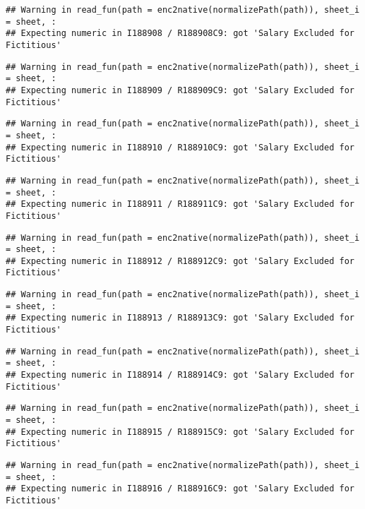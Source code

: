 \documentclass[
]{article}
\begin{document}
\begin{verbatim}
## Warning in read_fun(path = enc2native(normalizePath(path)), sheet_i = sheet, :
## Expecting numeric in I188908 / R188908C9: got 'Salary Excluded for Fictitious'
\end{verbatim}

\begin{verbatim}
## Warning in read_fun(path = enc2native(normalizePath(path)), sheet_i = sheet, :
## Expecting numeric in I188909 / R188909C9: got 'Salary Excluded for Fictitious'
\end{verbatim}

\begin{verbatim}
## Warning in read_fun(path = enc2native(normalizePath(path)), sheet_i = sheet, :
## Expecting numeric in I188910 / R188910C9: got 'Salary Excluded for Fictitious'
\end{verbatim}

\begin{verbatim}
## Warning in read_fun(path = enc2native(normalizePath(path)), sheet_i = sheet, :
## Expecting numeric in I188911 / R188911C9: got 'Salary Excluded for Fictitious'
\end{verbatim}

\begin{verbatim}
## Warning in read_fun(path = enc2native(normalizePath(path)), sheet_i = sheet, :
## Expecting numeric in I188912 / R188912C9: got 'Salary Excluded for Fictitious'
\end{verbatim}

\begin{verbatim}
## Warning in read_fun(path = enc2native(normalizePath(path)), sheet_i = sheet, :
## Expecting numeric in I188913 / R188913C9: got 'Salary Excluded for Fictitious'
\end{verbatim}

\begin{verbatim}
## Warning in read_fun(path = enc2native(normalizePath(path)), sheet_i = sheet, :
## Expecting numeric in I188914 / R188914C9: got 'Salary Excluded for Fictitious'
\end{verbatim}

\begin{verbatim}
## Warning in read_fun(path = enc2native(normalizePath(path)), sheet_i = sheet, :
## Expecting numeric in I188915 / R188915C9: got 'Salary Excluded for Fictitious'
\end{verbatim}

\begin{verbatim}
## Warning in read_fun(path = enc2native(normalizePath(path)), sheet_i = sheet, :
## Expecting numeric in I188916 / R188916C9: got 'Salary Excluded for Fictitious'
\end{verbatim}
\end{document}
